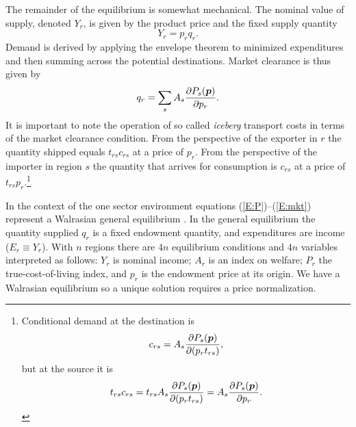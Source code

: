 \documentclass{ejb}
\newcommand{\pv}{\mbox{\boldmath$p$}}
\begin{document}
The remainder of the equilibrium is somewhat mechanical.  
The nominal value of supply, denoted $Y_r$, is given by the product
price and the fixed supply quantity 
\begin{equation}
\label{E:Inc}
Y_r = p_r q_r.
\end{equation}
Demand is derived by applying the envelope
theorem to minimized expenditures and then summing across the
potential destinations.  Market clearance is thus given by 
\begin{equation}
\label{E:mkt}
 q_r = \sum_s A_s \frac{\partial P_s(\pv)}{\partial p_r}.
\end{equation}
It is important to note the operation of so called \emph{iceberg}
transport costs in terms of the market clearance condition.  From the
perspective of the exporter in $r$ the quantity shipped equals
$t_{rs} c_{rs}$ at a price of $p_r$.  From the perspective of the
importer in region $s$ the quantity that arrives for consumption is
$c_{rs}$ at a price of $t_{rs} p_{r}$.\footnote{Conditional demand at
the destination is  
\[c_{rs} = A_s \frac{\partial 
P_s(\pv)}{\partial(p_r t_{rs})},\] 
but at the source it is 
\[t_{rs} c_{rs}=t_{rs} A_s \frac{\partial
P_s(\pv)}{\partial(p_r t_{rs})} = A_s \frac{\partial
P_s(\pv)}{\partial p_r}.\] }

In the context of the one sector \citet{AvW} environment equations
(\ref{E:P})--(\ref{E:mkt}) represent a Walrasian general equilibrium
\citep[see][]{estib}.  In the general equilibrium the quantity
supplied $q_r$ is a fixed endowment quantity, and expenditures are
income ($E_r \equiv Y_r$).  With $n$ regions there are $4n$
equilibrium conditions and $4n$ variables interpreted as follows:
$Y_r$ is nominal income; $A_r$ is an index on welfare; $P_r$ the
true-cost-of-living index, and $p_r$ is the endowment price at its
origin.  We have a Walrasian equilibrium so a unique solution
requires a price normalization.
\end{document}
